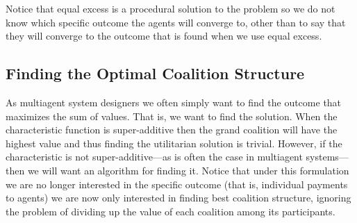 Notice that equal excess is a procedural solution to the problem so we
do not know which specific outcome the agents will converge to, other
than to say that they will converge to the outcome that is found when
we use equal excess.




\subsection{Finding the Optimal Coalition Structure}

As multiagent system designers we often simply want to find the
outcome that maximizes the sum of values. That is, we want to find the
 solution. When the characteristic function is
super-additive then the grand coalition will have the highest value
and thus finding the utilitarian solution is trivial. However, if the
characteristic is not super-additive---as is often the case in
multiagent systems---then we will want an algorithm for finding it.
Notice that under this formulation we are no longer interested in the
specific outcome (that is, individual payments to agents) we are now
only interested in finding best coalition structure, ignoring the
problem of dividing up the value of each coalition among its
participants.

